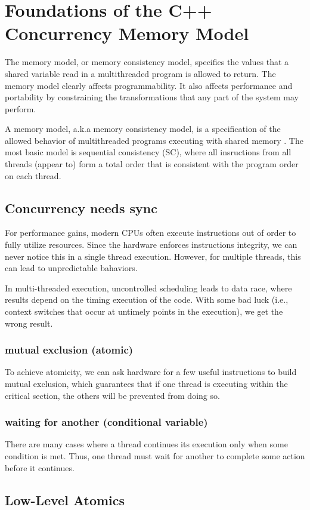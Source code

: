 \newpage
\section{Foundations of the C++ Concurrency Memory Model\cite{PPTTheC19:online,boehm2008foundations}}

The memory model, or memory consistency model, specifies the
values that a shared variable read in a multithreaded program is allowed to return. 
The memory model clearly affects programmability. 
It also affects performance and portability by constraining the
transformations that any part of the system may perform. 





A memory model, a.k.a memory consistency model, is a 
specification of the allowed behavior of multithreaded 
programs executing with shared memory . 
The most basic model is sequential consistency (SC), 
where all insructions from all threads (appear to) form a
 total order that is consistent with the program order on 
 each thread.



\subsection{Concurrency needs sync }

For performance gains, modern CPUs often execute 
instructions out of order to fully utilize resources.
 Since the hardware enforces instructions integrity,
  we can never notice this in a single thread execution. 
  However, for multiple threads, this can lead to 
  unpredictable bahaviors.

In multi-threaded execution, uncontrolled scheduling leads 
to data race, where results depend on the timing execution 
of the code. With some bad luck (i.e., context switches 
that occur at untimely points in the execution), we get 
the wrong result.

\subsubsection{mutual exclusion (atomic)}
To achieve atomicity, we can ask hardware for a few useful instructions to build mutual exclusion, which guarantees that if one thread is executing within the critical section, the others will be prevented from doing so.

\subsubsection{ waiting for another (conditional variable)}
There are many cases where a thread continues its execution 
only when some condition is met. Thus, one thread must wait
 for another to complete some action before it continues. 

\subsection{Low-Level Atomics}

